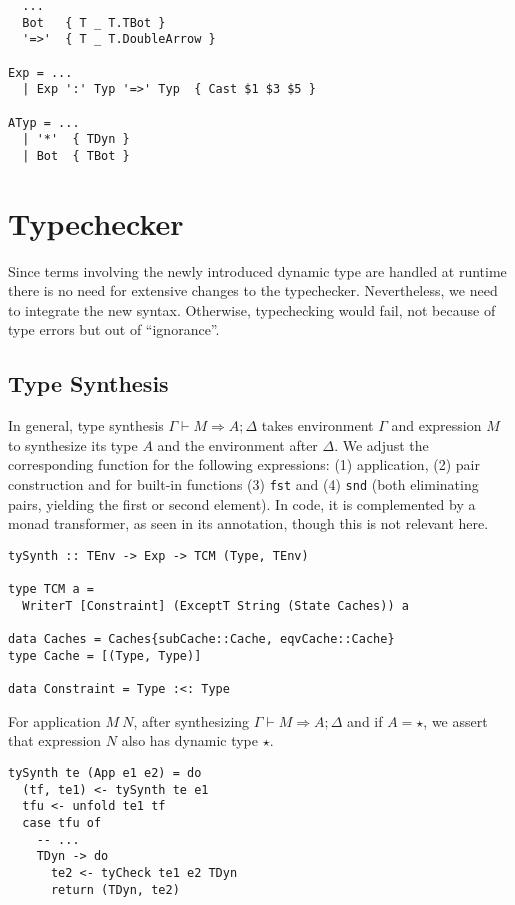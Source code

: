 \begin{lstlisting}[caption=Haskell: Extensions to \texttt{Parsing/Grammar.y}]
%token
  ...
  Bot   { T _ T.TBot }
  '=>'  { T _ T.DoubleArrow }

Exp = ...
  | Exp ':' Typ '=>' Typ  { Cast $1 $3 $5 }

ATyp = ...
  | '*'  { TDyn }
  | Bot  { TBot }
\end{lstlisting}

\section{Typechecker}

Since terms involving the newly introduced dynamic type are handled at runtime there is no need for extensive changes to the typechecker. Nevertheless, we need to integrate the new syntax. Otherwise, typechecking would fail, not because of type errors but out of ``ignorance''.

\subsection{Type Synthesis}

In general, type synthesis $\Gamma \vdash M \Rightarrow A;\Delta$ takes environment $\Gamma$ and expression $M$ to synthesize its type $A$ and the environment after $\Delta$. We adjust the corresponding function for the following expressions: (1) application, (2) pair construction and for built-in functions (3) \texttt{fst} and (4) \texttt{snd} (both eliminating pairs, yielding the first or second element). In code, it is complemented by a monad transformer, as seen in its annotation, though this is not relevant here.

\begin{lstlisting}[caption=Haskell: \texttt{tySynth} function type annotation]
tySynth :: TEnv -> Exp -> TCM (Type, TEnv)

type TCM a =
  WriterT [Constraint] (ExceptT String (State Caches)) a

data Caches = Caches{subCache::Cache, eqvCache::Cache}
type Cache = [(Type, Type)]

data Constraint = Type :<: Type
\end{lstlisting}

For application $M~N$, after synthesizing $\Gamma \vdash M \Rightarrow A;\Delta$ and if $A = \star$, we assert that expression $N$ also has dynamic type $\star$.

\begin{lstlisting}[caption=Haskell: Application type synthesis (\texttt{TCTyping.hs})]
tySynth te (App e1 e2) = do
  (tf, te1) <- tySynth te e1
  tfu <- unfold te1 tf
  case tfu of
    -- ...
    TDyn -> do
      te2 <- tyCheck te1 e2 TDyn
      return (TDyn, te2)
\end{lstlisting}

